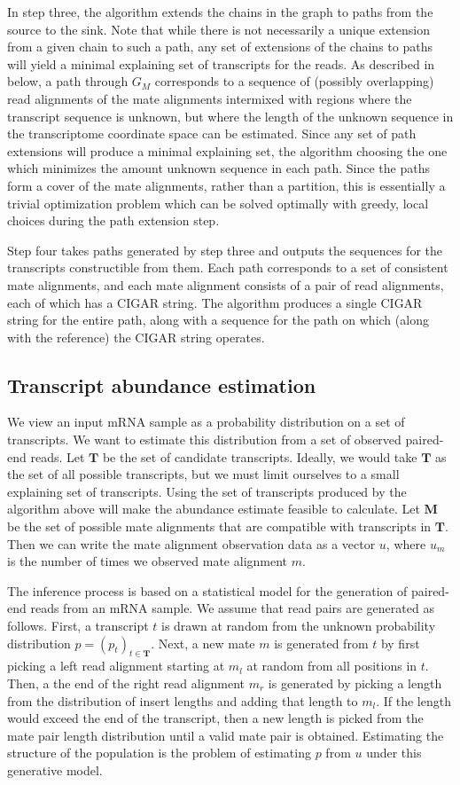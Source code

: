 \documentclass[twocolumn]{homework}
\theoremstyle{definition}
\begin{document}
In step three, the algorithm extends the chains in the graph to paths from the
source to the sink. Note that while there is not necessarily a unique
extension from a given chain to such a path, any set of extensions of the
chains to paths will yield a minimal explaining set of transcripts for the
reads. As described in below, a path through $G_M$ corresponds to a sequence
of (possibly overlapping) read alignments of the mate alignments intermixed
with regions where the transcript sequence is unknown, but where the length of
the unknown sequence in the transcriptome coordinate space can be estimated.
Since any set of path extensions will produce a minimal explaining set, the
algorithm choosing the one which minimizes the amount unknown sequence in each
path. Since the paths form a cover of the mate alignments, rather than a
partition, this is essentially a trivial optimization problem which can be
solved optimally with greedy, local choices during the path extension step.

Step four takes paths generated by step three and outputs the sequences for
the transcripts constructible from them. Each path corresponds to a set of
consistent mate alignments, and each mate alignment consists of a pair of read
alignments, each of which has a CIGAR string. The algorithm produces a single
CIGAR string for the entire path, along with a sequence for the path on which
(along with the reference) the CIGAR string operates.

\subsection{Transcript abundance estimation} We view an input mRNA sample as a
probability distribution on a set of transcripts. We want to estimate this
distribution from a set of observed paired-end reads. Let $\mathbf{T}$ be the
set of candidate transcripts. Ideally, we would take $\mathbf{T}$ as the set
of all possible transcripts, but we must limit ourselves to a small explaining
set of transcripts. Using the set of transcripts produced by the algorithm
above will make the abundance estimate feasible to calculate. Let $\mathbf{M}$
be the set of possible mate alignments that are compatible with transcripts in
$\mathbf{T}$. Then we can write the mate alignment observation data as a
vector $u$, where $u_m$ is the number of times we observed mate alignment $m$.

The inference process is based on a statistical model for the generation of
paired-end reads from an mRNA sample. We assume that read pairs are generated
as follows. First, a transcript $t$ is drawn at random from the unknown
probability distribution $p=(p_t)_{t \in \mathbf{T}}$. Next, a new mate $m$ is
generated from $t$ by first picking a left read alignment starting at $m_l$ at
random from all positions in $t$. Then, a the end of the right read alignment
$m_r$ is generated by picking a length from the distribution of insert lengths
and adding that length to $m_l$. If the length would exceed the end of the
transcript, then a new length is picked from the mate pair length distribution
until a valid mate pair is obtained. Estimating the structure of the
population is the problem of estimating $p$ from $u$ under this generative
model.
\end{document}
